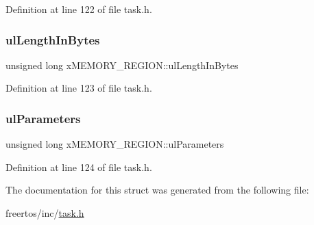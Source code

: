 Definition at line 122 of file task.\+h.

\mbox{\label{structxMEMORY__REGION_ac296475c5bdf95765db1786789e3aa4d}} 
\subsubsection{\texorpdfstring{ul\+Length\+In\+Bytes}{ulLengthInBytes}}
{\footnotesize\ttfamily unsigned long x\+M\+E\+M\+O\+R\+Y\+\_\+\+R\+E\+G\+I\+O\+N\+::ul\+Length\+In\+Bytes}



Definition at line 123 of file task.\+h.

\mbox{\label{structxMEMORY__REGION_a8750b0cad9c8b2c602ca9f0f2342b3aa}} 
\subsubsection{\texorpdfstring{ul\+Parameters}{ulParameters}}
{\footnotesize\ttfamily unsigned long x\+M\+E\+M\+O\+R\+Y\+\_\+\+R\+E\+G\+I\+O\+N\+::ul\+Parameters}



Definition at line 124 of file task.\+h.



The documentation for this struct was generated from the following file\+:\begin{DoxyCompactItemize}
\item 
freertos/inc/\hyperlink{task_8h}{task.\+h}\end{DoxyCompactItemize}
